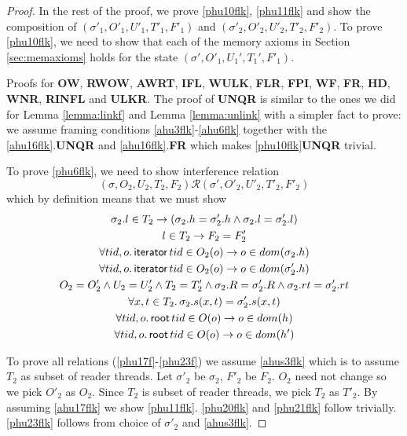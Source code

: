 \begin{proof}
In the rest of the proof, we prove \ref{phu10flk}, \ref{phu11flk} and show the composition of $(\sigma'_1, O'_1, U'_1,T'_1,F'_1)$ and  $(\sigma'_2, O'_2, U'_2,T'_2,F'_2)$. To prove \ref{phu10flk}, we need to show that each of the memory axioms in Section \ref{sec:memaxioms} holds for the state $(\sigma',O'_1,U_1',T_1',F'_1)$.

Proofs for \textbf{OW}, \textbf{RWOW}, \textbf{AWRT}, \textbf{IFL}, \textbf{WULK}, \textbf{FLR}, \textbf{FPI}, \textbf{WF}, \textbf{FR}, \textbf{HD}, \textbf{WNR}, \textbf{RINFL} and \textbf{ULKR}. The proof of \textbf{UNQR} is similar to the ones  we did for Lemma  \ref{lemma:linkf} and Lemma \ref{lemma:unlink} with a simpler fact to prove: we assume framing conditions \ref{ahu3flk}-\ref{ahu6flk} together with the \ref{ahu16flk}.\textbf{UNQR} and \ref{ahu16flk}.\textbf{FR} which makes \ref{phu10flk}\textbf{UNQR} trivial.

To prove \ref{phu6flk}, we need to show  interference relation
\[(\sigma, O_2, U_2, T_2,F_2) \mathcal{R} (\sigma', O'_2, U'_2, T'_2,F'_2)  \]
which by definition means that we must show 
\begin{gather}\label{phu17flk}
  \sigma_2.l  \in  T_2 \rightarrow (\sigma_2.h =\sigma'_2.h \land \sigma_2.l=\sigma'_2.l)\\
  \label{phu18flk}
  l\in T_2\rightarrow F_2=F_2'\\
  \label{phu20flk}
  \forall tid,o\ldotp\textsf{iterator} \, tid \in O_2(o) \rightarrow o \in dom(\sigma_2.h) \\
  \label{phu21flk}
  \forall tid,o\ldotp\textsf{iterator} \, tid \in O_2(o) \rightarrow o \in dom(\sigma'_2.h) \\
  \label{phu22flk}
  O_2 = O_2' \land U_2 = U_2' \land T_2 = T_2' \land \sigma_2.R = \sigma'_2.R \land \sigma_2.rt = \sigma'_2.rt \\
  \label{phu23flk}
  \forall x, t \in T_2 \ldotp \sigma_2.s(x,t) = \sigma'_2.s(x,t) \\
    \label{phufrt1lk}
  \forall tid,o\ldotp\textsf{root} \, tid \in O(o) \rightarrow o \in dom(h) \\
  \label{phufrt2lk}
  \forall tid,o\ldotp\textsf{root} \, tid \in O(o) \rightarrow o \in dom(h') 
\end{gather}

To prove all relations (\ref{phu17f}-\ref{phu23f}) we assume \ref{ahus3flk} which is to assume $T_2$ as subset of reader threads. Let $\sigma'_2$ be $\sigma_2$, $F'_2$ be $F_2$. $O_2$ need not change so we pick $O'_2$  as $O_2$. Since $T_2$ is subset of reader threads, we pick $T_2$ as  $T'_2$. By assuming \ref{ahu17flk}  we show \ref{phu11flk}. \ref{phu20flk} and \ref{phu21flk} follow trivially. \ref{phu23flk} follows from choice of $\sigma'_2$ and \ref{ahus3flk}.


\end{proof}
